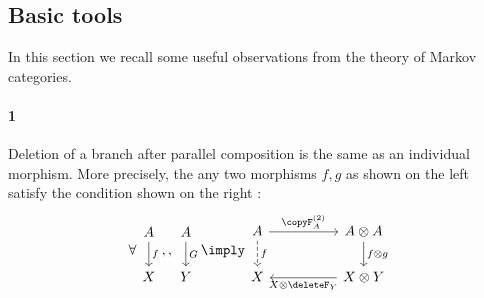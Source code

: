 \documentclass[12pt,oneside,pb-diagram]{article}
\begin{document}
\subsection{Basic tools}

In this section we recall some useful observations from the theory of Markov categories.

\paragraph{1} Deletion of a branch after parallel composition is the same as an individual morphism. More precisely, the any two morphisms $f,g$ as shown on the left satisfy the condition shown on the right :
%
\begin{equation} \label{eqn:kfad03}
	\forall
	\begin{tikzcd} A \arrow[d, "f"] \\ X \end{tikzcd} ,
	,
	\begin{tikzcd} A \arrow[d, "G"] \\ Y \end{tikzcd}
	\imply
	\begin{tikzcd}
		A \arrow[d, dashed, "f"] \arrow[rr, "\copyF_A^{(2)}"] && A \otimes A \arrow[d, "f\otimes g"] \\
		X && X\otimes Y \arrow[ll, "X\otimes \deleteF_Y"]
	\end{tikzcd}
\end{equation}
%
\end{document}
